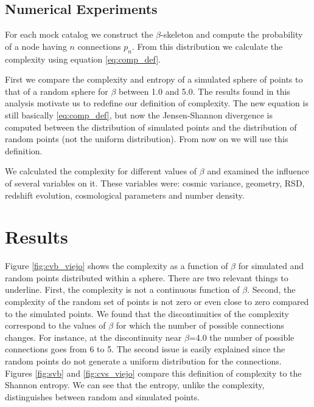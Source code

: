 \documentclass[fleqn,usenatbib]{mnras}
\begin{document}
\subsection{Numerical Experiments}

For each mock catalog we construct the $\beta$-skeleton and compute
the probability of a node having $n$ connections $p_n$. From this
distribution we calculate the complexity using equation
\ref{eq:comp_def}.  

First we compare the complexity and entropy of a simulated sphere of
points to that of a random sphere for $\beta$ between 1.0 and 5.0. The
results found in this analysis motivate us to redefine our definition
of complexity. The new equation is still basically \ref{eq:comp_def},
but now the Jensen-Shannon divergence is computed between the
distribution of simulated points and the distribution of random points
(not the uniform distribution). From now on we will use this
definition. 

We calculated the complexity for different values of $\beta$ and
examined the influence of several variables on it. These variables
were: cosmic variance, geometry, RSD, redshift evolution, cosmological
parameters and number density. 







\section{Results}
\label{sec:results}

Figure \ref{fig:cvb_viejo} shows the complexity as a function of
$\beta$ for simulated and random points distributed within a
sphere. There are two relevant things to underline. First, the
complexity is not a continuous function of $\beta$. Second, the
complexity of the random set of points is not zero or even close to
zero compared to the simulated points. We found that the
discontinuities of the complexity correspond to the values of $\beta$
for which the number of possible connections changes. For instance, at
the discontinuity near $\beta$=4.0 the number of possible connections
goes from 6 to 5. The second issue is easily explained since the
random points do not generate a uniform distribution for the
connections. Figures \ref{fig:svb} and \ref{fig:cvs_viejo} compare
this definition of complexity to the Shannon entropy. We can see that
the entropy, unlike the complexity, distinguishes between random and
simulated points.  
\end{document}
